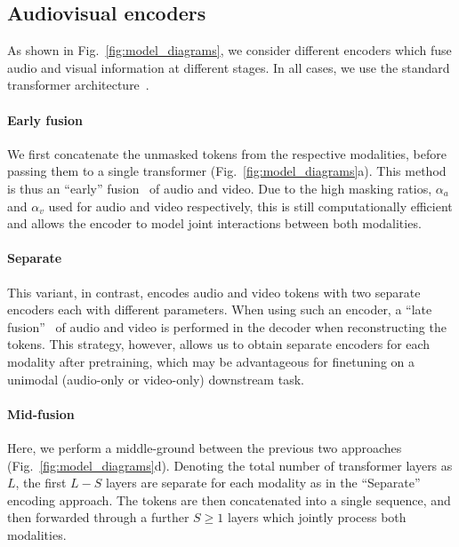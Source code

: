 \documentclass[10pt,twocolumn,letterpaper]{article}
\def \paravspace {-1\baselineskip}
\begin{document}
\subsection{Audiovisual encoders}
\label{sec:method_encoders}
\vspace{-1mm}

As shown in Fig.~\ref{fig:model_diagrams}, we consider different encoders which fuse audio and visual information at different stages. In all cases, we use the standard transformer architecture~\cite{dosovitskiy_iclr_2021,vaswani_neurips_2017}.

\vspace{\paravspace}
\paragraph{Early fusion}
We first concatenate the unmasked tokens from the respective modalities, before passing them to a single transformer (Fig.~\ref{fig:model_diagrams}a).
This method is thus an ``early'' fusion~\cite{karpathy_cvpr_2014} of audio and video.
Due to the high masking ratios, $\alpha_a$ and $\alpha_v$ used for audio and video respectively, this is still computationally efficient and allows the encoder to model joint interactions between both modalities.

\vspace{\paravspace}
\paragraph{Separate}
This variant, in contrast, encodes audio and video tokens with two separate encoders each with different parameters.
When using such an encoder, a ``late fusion''~\cite{karpathy_cvpr_2014,simonyan_neurips_2014} of audio and video is performed in the decoder when reconstructing the tokens.
This strategy, however, allows us to obtain separate encoders for each modality after pretraining, which may be advantageous for finetuning on a unimodal (\ie audio-only or video-only) downstream task.

\vspace{\paravspace}
\paragraph{Mid-fusion}
Here, we perform a middle-ground between the previous two approaches (Fig.~\ref{fig:model_diagrams}d).
Denoting the total number of transformer layers as $L$, the first $L - S$ layers are separate for each modality as in the ``Separate'' encoding approach.
The tokens are then concatenated into a single sequence, and then forwarded through a further $S \geq 1$ layers which jointly process both modalities.
\end{document}
